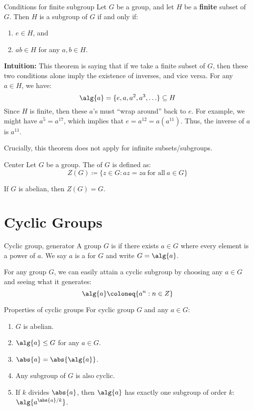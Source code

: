 \begin{thmbox}{Conditions for finite subgroup}{}
    Let $G$ be a group, and let $H$ be a \textbf{finite} subset of $G$. Then $H$ is a subgroup of $G$ if and only if:
    \begin{enumerate}
        \item $e \in H$, and
        \item $ab \in H$ for any $a,b \in H$.
    \end{enumerate}
    \tcblower
    \textbf{Intuition:} This theorem is saying that if we take a finite subset of $G$, then these two conditions alone imply the existence of inverses, and vice versa. For any $a \in H$, we have:
    \[ \alg{a} = \{e, a, a^2, a^3, \ldots \} \subseteq H \]
    Since $H$ is finite, then these $a$'s must ``wrap around'' back to $e$. For example, we might have $a^5 = a^{17}$, which implies that $e = a^{12} = a(a^{11})$. Thus, the inverse of $a$ is $a^{11}$.
\end{thmbox}

Crucially, this theorem does not apply for infinite subsets/subgroups. 

\begin{dfnbox}{Center}{}
    Let $G$ be a group. The  of $G$ is defined as:
    \[ Z(G) \coloneq \{ z \in G : az = za\ \text{for all}\ a \in G \} \]
\end{dfnbox}

If $G$ is abelian, then $Z(G) = G$.


\section{Cyclic Groups}

\begin{dfnbox}{Cyclic group, generator}{}
    A group $G$ is  if there exists $a \in G$ where every element is a power of $a$. We say $a$ is a  for $G$ and write $G = \alg{a}$.
\end{dfnbox}

For any group $G$, we can easily attain a cyclic subgroup by choosing any $a \in G$ and seeing what it generates:
\[ \alg{a} \coloneq \{ a^n : n \in Z \} \]

\begin{thmbox}{Properties of cyclic groups}{}
    For cyclic group $G$ and any $a \in G$:
    \begin{enumerate}
        \item $G$ is abelian.
        \item $\alg{a} \leq G$ for any $a \in G$.
        \item $\abs{a} = \abs{\alg{a}}$.
        \item Any subgroup of $G$ is also cyclic.
        \item If $k$ divides $\abs{a}$, then $\alg{a}$ has exactly one subgroup of order $k$: $\alg{a^{\abs{a}/k}}$.
    \end{enumerate}
\end{thmbox}

